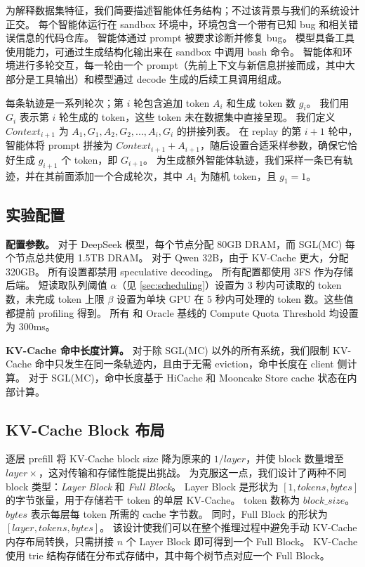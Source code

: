 为解释数据集特征，我们简要描述智能体任务结构；不过该背景与我们的系统设计正交。
每个智能体运行在 sandbox 环境中，环境包含一个带有已知 bug 和相关错误信息的代码仓库。
智能体通过 prompt 被要求诊断并修复 bug。
模型具备工具使用能力，可通过生成结构化输出来在 sandbox 中调用 bash 命令。
智能体和环境进行多轮交互，每一轮由一个 prompt（先前上下文与新信息拼接而成，其中大部分是工具输出）和模型通过 decode 生成的后续工具调用组成。

每条轨迹是一系列轮次；第 $i$ 轮包含追加 token $A_i$ 和生成 token 数 $g_i$。
我们用 $G_i$ 表示第 $i$ 轮生成的 token，这些 token 未在数据集中直接呈现。
我们定义 $Context_{i+1}$ 为 $A_1, G_1, A_2, G_2, ..., A_i, G_i$ 的拼接列表。
在 replay 的第 $i+1$ 轮中，智能体将 prompt 拼接为 $Context_{i+1} + A_{i+1}$，随后设置合适采样参数，确保它恰好生成 $g_{i+1}$ 个 token，即 $G_{i+1}$。
为生成额外智能体轨迹，我们采样一条已有轨迹，并在其前面添加一个合成轮次，其中 $A_1$ 为随机 token，且 $g_1=1$。

\subsection{实验配置}
\label{sec:experimental-configurations}


\textbf{配置参数。}
对于 DeepSeek 模型，\sysname 每个节点分配 80GB DRAM，而 SGL(MC) 每个节点总共使用 1.5TB DRAM。
对于 Qwen 32B，由于 KV-Cache 更大，\sysname 分配 320GB。
所有设置都禁用 speculative decoding。
所有配置都使用 3FS 作为存储后端。
短读取队列阈值 $\alpha$（见 \autoref{sec:scheduling}）设置为 3 秒内可读取的 token 数，未完成 token 上限 $\beta$ 设置为单块 GPU 在 5 秒内可处理的 token 数。这些值都提前 profiling 得到。
所有 \sysname 和 Oracle 基线的 Compute Quota Threshold 均设置为 300ms。

\textbf{KV-Cache 命中长度计算。}
对于除 SGL(MC) 以外的所有系统，我们限制 KV-Cache 命中只发生在同一条轨迹内，且由于无需 eviction，命中长度在 client 侧计算。
对于 SGL(MC)，命中长度基于 HiCache 和 Mooncake Store cache 状态在内部计算。

\subsection{KV-Cache Block 布局}
\label{subsec:block-layout}
逐层 prefill 将 KV-Cache block size 降为原来的 $1/layer$，并使 block 数量增至 $layer\times$，这对传输和存储性能提出挑战。
为克服这一点，我们设计了两种不同 block 类型：\emph{Layer Block} 和 \emph{Full Block}。
Layer Block 是形状为 $[1, tokens, bytes]$ 的字节张量，用于存储若干 token 的单层 KV-Cache。
token 数称为 $block\_size$。
$bytes$ 表示每层每 token 所需的 cache 字节数。
同时，Full Block 的形状为 $[layer, tokens, bytes]$。
该设计使我们可以在整个推理过程中避免手动 KV-Cache 内存布局转换，只需拼接 $n$ 个 Layer Block 即可得到一个 Full Block。
KV-Cache 使用 trie 结构存储在分布式存储中，其中每个树节点对应一个 Full Block。
